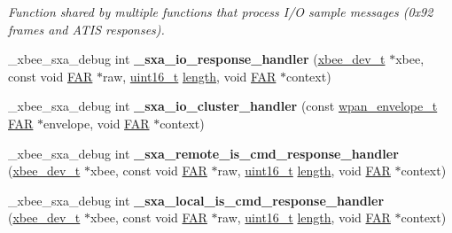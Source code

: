 \begin{DoxyCompactItemize}
\begin{DoxyCompactList}\small\item\em Function shared by multiple functions that process I/O sample messages (0x92 frames and A\+T\+IS responses). \end{DoxyCompactList}\item 
\mbox{\label{group___s_x_a_ga2cefa3759e8a990ec49519b6154295fe}} 
\+\_\+xbee\+\_\+sxa\+\_\+debug int {\bfseries \+\_\+sxa\+\_\+io\+\_\+response\+\_\+handler} (\hyperlink{structxbee__dev__t}{xbee\+\_\+dev\+\_\+t} $\ast$xbee, const void \hyperlink{group__hal_gaef060b3456fdcc093a7210a762d5f2ed}{F\+AR} $\ast$raw, \hyperlink{group__hal__dos_ga5a8b2dc9e45a9ee81a94ef304fb62505}{uint16\+\_\+t} \hyperlink{group__zdo_gab2b3adeb2a67e656ff030b56727fd0ac}{length}, void \hyperlink{group__hal_gaef060b3456fdcc093a7210a762d5f2ed}{F\+AR} $\ast$context)
\item 
\mbox{\label{group___s_x_a_ga44f8ee62266041b8996967081fe6479f}} 
\+\_\+xbee\+\_\+sxa\+\_\+debug int {\bfseries \+\_\+sxa\+\_\+io\+\_\+cluster\+\_\+handler} (const \hyperlink{structwpan__envelope__t}{wpan\+\_\+envelope\+\_\+t} \hyperlink{group__hal_gaef060b3456fdcc093a7210a762d5f2ed}{F\+AR} $\ast$envelope, void \hyperlink{group__hal_gaef060b3456fdcc093a7210a762d5f2ed}{F\+AR} $\ast$context)
\item 
\mbox{\label{group___s_x_a_gaba26b5a39ec4012c2abf63d16f4ab765}} 
\+\_\+xbee\+\_\+sxa\+\_\+debug int {\bfseries \+\_\+sxa\+\_\+remote\+\_\+is\+\_\+cmd\+\_\+response\+\_\+handler} (\hyperlink{structxbee__dev__t}{xbee\+\_\+dev\+\_\+t} $\ast$xbee, const void \hyperlink{group__hal_gaef060b3456fdcc093a7210a762d5f2ed}{F\+AR} $\ast$raw, \hyperlink{group__hal__dos_ga5a8b2dc9e45a9ee81a94ef304fb62505}{uint16\+\_\+t} \hyperlink{group__zdo_gab2b3adeb2a67e656ff030b56727fd0ac}{length}, void \hyperlink{group__hal_gaef060b3456fdcc093a7210a762d5f2ed}{F\+AR} $\ast$context)
\item 
\mbox{\label{group___s_x_a_gaecaa5cfd1a9568899d54920909a01081}} 
\+\_\+xbee\+\_\+sxa\+\_\+debug int {\bfseries \+\_\+sxa\+\_\+local\+\_\+is\+\_\+cmd\+\_\+response\+\_\+handler} (\hyperlink{structxbee__dev__t}{xbee\+\_\+dev\+\_\+t} $\ast$xbee, const void \hyperlink{group__hal_gaef060b3456fdcc093a7210a762d5f2ed}{F\+AR} $\ast$raw, \hyperlink{group__hal__dos_ga5a8b2dc9e45a9ee81a94ef304fb62505}{uint16\+\_\+t} \hyperlink{group__zdo_gab2b3adeb2a67e656ff030b56727fd0ac}{length}, void \hyperlink{group__hal_gaef060b3456fdcc093a7210a762d5f2ed}{F\+AR} $\ast$context)

\end{DoxyCompactItemize}
